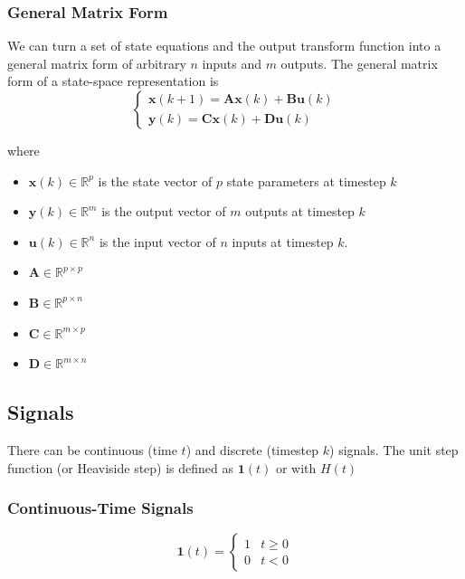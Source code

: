 \documentclass[11pt]{article}
\begin{document}
\subsubsection{General Matrix Form}
We can turn a set of state equations and the output transform function into a general matrix form of arbitrary $n$ inputs and $m$ outputs.
The general matrix form of a state-space representation is
\begin{equation}
  \begin{cases}
    \textbf{x} (k+1) = \textbf{A} \textbf{x} (k) + \textbf{B} \textbf{u} (k) \\
    \textbf{y}(k) = \textbf{C} \textbf{x} (k) + \textbf{D} \textbf{u} (k)
  \end{cases}
\end{equation}

where 
\begin{itemize}
  \item $\textbf{x}(k) \in \mathbb{R}^p$ is the state vector of $p$ state parameters at timestep $k$
  \item $\textbf{y}(k) \in \mathbb{R}^m$ is the output vector of $m$ outputs at timestep $k$
  \item $\textbf{u}(k) \in \mathbb{R}^n$ is the input vector of $n$ inputs at timestep $k$.
  \item $\textbf{A} \in \mathbb{R}^{p \times p}$
  \item $\textbf{B} \in \mathbb{R}^{p \times n}$
  \item $\textbf{C} \in \mathbb{R}^{m \times p}$
  \item $\textbf{D} \in \mathbb{R}^{m \times n}$
\end{itemize}

\subsection{Signals}
There can be continuous (time $t$) and discrete (timestep $k$) signals.
The unit step function (or Heaviside step) is defined as $\textbf{1}(t)$ or with $H(t)$

\subsubsection{Continuous-Time Signals}
\begin{equation}
  \textbf{1}(t) =
  \begin{cases}
    1 & t \geq 0 \\
    0 & t < 0
  \end{cases}
\end{equation}
\end{document}
